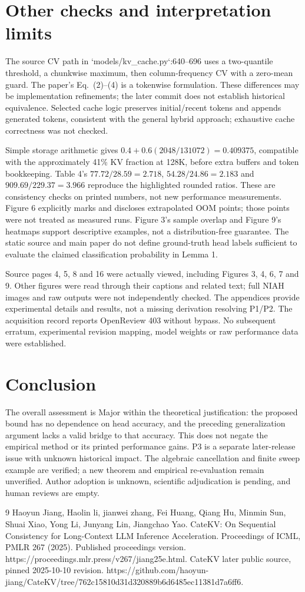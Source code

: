 \documentclass[10pt]{article}
\begin{document}
\section*{Other checks and interpretation limits}
The source CV path in `models/kv\_cache.py`:640–696 uses a two-quantile threshold, a chunkwise maximum, then column-frequency CV with a zero-mean guard. The paper’s Eq. (2)–(4) is a tokenwise formulation. These differences may be implementation refinements; the later commit does not establish historical equivalence. Selected cache logic preserves initial/recent tokens and appends generated tokens, consistent with the general hybrid approach; exhaustive cache correctness was not checked.\par
Simple storage arithmetic gives \(0.4+0.6(2048/131072)=0.409375\), compatible with the approximately 41\% KV fraction at 128K, before extra buffers and token bookkeeping. Table 4’s \(77.72/28.59=2.718\), \(54.28/24.86=2.183\) and \(909.69/229.37=3.966\) reproduce the highlighted rounded ratios. These are consistency checks on printed numbers, not new performance measurements. Figure 6 explicitly marks and discloses extrapolated OOM points; those points were not treated as measured runs. Figure 3’s sample overlap and Figure 9’s heatmaps support descriptive examples, not a distribution-free guarantee. The static source and main paper do not define ground-truth head labels sufficient to evaluate the claimed classification probability in Lemma 1.\par
Source pages 4, 5, 8 and 16 were actually viewed, including Figures 3, 4, 6, 7 and 9. Other figures were read through their captions and related text; full NIAH images and raw outputs were not independently checked. The appendices provide experimental details and results, not a missing derivation resolving P1/P2. The acquisition record reports OpenReview 403 without bypass. No subsequent erratum, experimental revision mapping, model weights or raw performance data were established.\par
\section*{Conclusion}
The overall assessment is Major within the theoretical justification: the proposed bound has no dependence on head accuracy, and the preceding generalization argument lacks a valid bridge to that accuracy. This does not negate the empirical method or its printed performance gains. P3 is a separate later-release issue with unknown historical impact. The algebraic cancellation and finite sweep example are verified; a new theorem and empirical re-evaluation remain unverified. Author adoption is unknown, scientific adjudication is pending, and human reviews are empty.\par
9 Haoyun Jiang, Haolin li, jianwei zhang, Fei Huang, Qiang Hu, Minmin Sun, Shuai Xiao, Yong Li, Junyang Lin, Jiangchao Yao. CateKV: On Sequential Consistency for Long-Context LLM Inference Acceleration. Proceedings of ICML, PMLR 267 (2025). Published proceedings version. https://proceedings.mlr.press/v267/jiang25e.html. CateKV later public source, pinned 2025-10-10 revision. https://github.com/haoyun-jiang/CateKV/tree/762c15810d31d320889b6d6485ec11381d7a6ff6.\par
\end{document}
